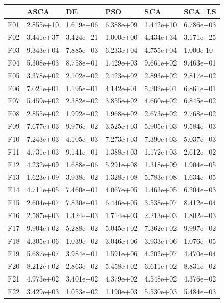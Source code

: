 \begin{tabular}{llllll}
\toprule
{} &       ASCA &         DE &        PSO &        SCA &     SCA\_LS \\
\midrule
F01  &  2.855e+10 &  1.619e+06 &  6.388e+09 &  1.442e+10 &  6.786e+03 \\
F02  &  3.441e+37 &  3.424e+21 &  1.000e+00 &  4.434e+34 &  3.171e+25 \\
F03  &  9.343e+04 &  7.885e+03 &  6.233e+04 &  4.755e+04 &  1.000e-10 \\
F04  &  5.308e+03 &  8.758e+01 &  1.429e+03 &  9.661e+02 &  9.463e+01 \\
F05  &  3.378e+02 &  2.102e+02 &  2.423e+02 &  2.893e+02 &  2.817e+02 \\
F06  &  7.021e+01 &  1.195e+01 &  4.142e+01 &  5.202e+01 &  6.861e+01 \\
F07  &  5.459e+02 &  2.382e+02 &  3.855e+02 &  4.660e+02 &  6.845e+02 \\
F08  &  2.855e+02 &  1.992e+02 &  1.968e+02 &  2.673e+02 &  2.768e+02 \\
F09  &  7.677e+03 &  9.976e+02 &  3.525e+03 &  5.905e+03 &  9.584e+03 \\
F10  &  7.243e+03 &  4.105e+03 &  7.273e+03 &  7.390e+03 &  5.037e+03 \\
F11  &  4.731e+03 &  9.141e+01 &  1.388e+03 &  1.172e+03 &  2.612e+02 \\
F12  &  4.232e+09 &  1.688e+06 &  5.291e+08 &  1.318e+09 &  1.904e+05 \\
F13  &  1.623e+09 &  3.938e+02 &  1.328e+08 &  5.783e+08 &  1.634e+05 \\
F14  &  4.711e+05 &  7.460e+01 &  4.067e+05 &  1.463e+05 &  6.204e+03 \\
F15  &  2.604e+07 &  7.830e+01 &  6.446e+05 &  3.538e+07 &  8.412e+04 \\
F16  &  2.587e+03 &  1.424e+03 &  1.714e+03 &  2.213e+03 &  1.802e+03 \\
F17  &  9.904e+02 &  5.288e+02 &  5.045e+02 &  7.362e+02 &  9.997e+02 \\
F18  &  4.305e+06 &  1.039e+02 &  3.046e+06 &  3.933e+06 &  1.076e+05 \\
F19  &  5.687e+07 &  3.984e+01 &  1.591e+06 &  4.202e+07 &  4.470e+04 \\
F20  &  8.212e+02 &  2.863e+02 &  5.458e+02 &  6.611e+02 &  8.831e+02 \\
F21  &  4.973e+02 &  3.401e+02 &  4.379e+02 &  4.548e+02 &  4.376e+02 \\
F22  &  3.429e+03 &  1.053e+02 &  1.190e+03 &  5.530e+03 &  5.484e+03 \\

\end{tabular}
